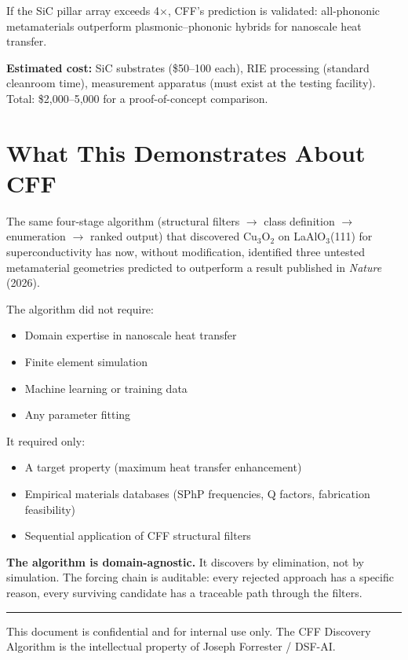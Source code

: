 \documentclass[11pt, a4paper]{article}
\begin{document}
If the SiC pillar array exceeds 4$\times$, CFF's prediction
is validated: all-phononic metamaterials outperform
plasmonic--phononic hybrids for nanoscale heat transfer.

\textbf{Estimated cost:} SiC substrates (\$50--100 each),
RIE processing (standard cleanroom time), measurement
apparatus (must exist at the testing facility). Total:
\$2,000--5,000 for a proof-of-concept comparison.

\section{What This Demonstrates About CFF}

The same four-stage algorithm (structural filters $\to$ class
definition $\to$ enumeration $\to$ ranked output) that
discovered Cu$_3$O$_2$ on LaAlO$_3$(111) for superconductivity
has now, without modification, identified three untested
metamaterial geometries predicted to outperform a result
published in \textit{Nature} (2026).

The algorithm did not require:
\begin{itemize}[nosep]
  \item Domain expertise in nanoscale heat transfer
  \item Finite element simulation
  \item Machine learning or training data
  \item Any parameter fitting
\end{itemize}

It required only:
\begin{itemize}[nosep]
  \item A target property (maximum heat transfer enhancement)
  \item Empirical materials databases (SPhP frequencies, Q
        factors, fabrication feasibility)
  \item Sequential application of CFF structural filters
\end{itemize}

\textbf{The algorithm is domain-agnostic.} It discovers by
elimination, not by simulation. The forcing chain is
auditable: every rejected approach has a specific reason,
every surviving candidate has a traceable path through the
filters.

\vspace{2em}\hrule\vspace{0.5em}
{\color{nm-gray}\small This document is confidential and for
internal use only. The CFF Discovery Algorithm is the
intellectual property of Joseph Forrester / DSF-AI.}
\end{document}
